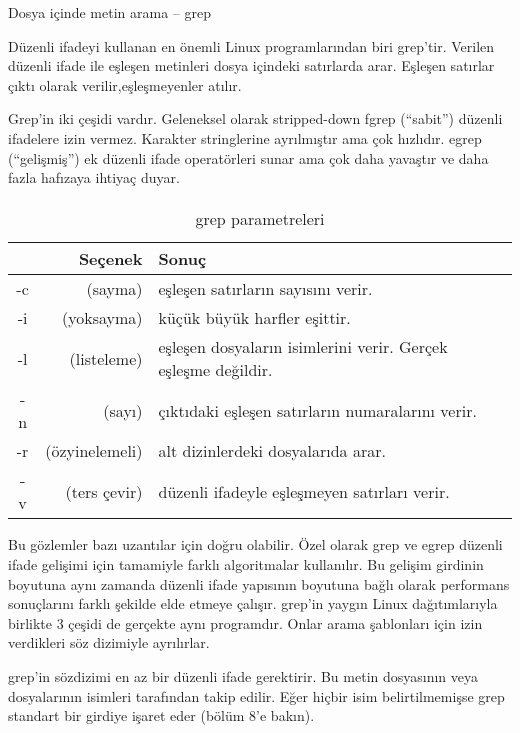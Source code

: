\begin{section}{Dosya içinde metin arama – grep}

Düzenli ifadeyi kullanan en önemli Linux programlarından biri grep’tir. Verilen düzenli ifade ile eşleşen metinleri dosya içindeki satırlarda arar. Eşleşen satırlar çıktı olarak verilir,eşleşmeyenler atılır.

Grep’in iki çeşidi vardır. Geleneksel olarak stripped-down fgrep (“sabit”) düzenli ifadelere izin vermez. Karakter stringlerine ayrılmıştır ama çok hızlıdır. egrep (“gelişmiş”) ek düzenli ifade operatörleri sunar ama çok daha yavaştır ve daha fazla hafızaya ihtiyaç duyar.

\paragraph{}{
\begin {table}[H]
\caption {grep parametreleri} \label{tab:title} 
\begin{tabular}{c r l}
\hline
{} & Seçenek & Sonuç\\
\hline
-c &	(sayma)	&	eşleşen satırların sayısını verir.\\
-i	&(yoksayma)	&küçük büyük harfler eşittir.\\
-l	&(listeleme)&	eşleşen dosyaların isimlerini verir. Gerçek eşleşme değildir.\\
-n	&(sayı)&		çıktıdaki eşleşen satırların numaralarını verir.\\
-r	&(özyinelemeli)&	alt dizinlerdeki dosyalarıda arar.\\
-v&	(ters çevir)&	düzenli ifadeyle eşleşmeyen satırları verir.\\
\hline
\end{tabular}
\end {table}
}

Bu gözlemler bazı uzantılar için doğru olabilir. Özel olarak grep ve egrep düzenli ifade gelişimi için tamamiyle farklı algoritmalar kullanılır. Bu gelişim girdinin boyutuna aynı zamanda düzenli ifade yapısının boyutuna bağlı olarak performans sonuçlarını farklı şekilde elde etmeye çalışır. grep’in yaygın Linux dağıtımlarıyla birlikte 3 çeşidi de gerçekte aynı programdır. Onlar arama şablonları için izin verdikleri söz dizimiyle ayrılırlar.

grep’in sözdizimi en az bir düzenli ifade gerektirir. Bu metin dosyasının veya dosyalarının isimleri tarafından takip edilir. Eğer hiçbir isim belirtilmemişse grep standart bir girdiye işaret eder (bölüm 8’e bakın).


\end{section}
